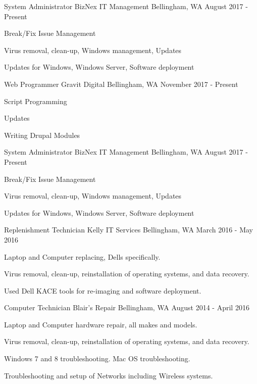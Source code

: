 \begin{cventries}
  \cventry
    {System Administrator}
    {BizNex IT Management}
    {Bellingham, WA}
    {August 2017 - Present}
    {
      \begin{cvitems}
      \item {Break/Fix Issue Management}
      \item {Virus removal, clean-up, Windows management, Updates}
      \item {Updates for Windows, Windows Server, Software deployment}
      \end{cvitems}
    }
  
  \cventry
    {Web Programmer}
    {Gravit Digital}
    {Bellingham, WA}
    {November 2017 - Present}
    {
      \begin{cvitems}
      \item {Script Programming}
      \item {Updates}
      \item {Writing Drupal Modules}
      \end{cvitems}
    }

  \cventry
    {System Administrator}
    {BizNex IT Management}
    {Bellingham, WA}
    {August 2017 - Present}
    {
      \begin{cvitems}
      \item {Break/Fix Issue Management}
      \item {Virus removal, clean-up, Windows management, Updates}
      \item {Updates for Windows, Windows Server, Software deployment}
      \end{cvitems}
    }

  \cventry
    {Replenishment Technician}
    {Kelly IT Services}
    {Bellingham, WA}
    {March 2016 - May 2016}
    {
      \begin{cvitems}
        \item {Laptop and Computer replacing, Dells specifically.}
        \item {Virus removal, clean-up, reinstallation of operating systems, and data recovery.}
        \item {Used Dell KACE tools for re-imaging and software deployment.}
      \end{cvitems}
    }

  \cventry
    {Computer Technician}
    {Blair’s Repair}
    {Bellingham, WA}
    {August 2014 - April 2016}
    {
      \begin{cvitems}
        \item {Laptop and Computer hardware repair, all makes and models.}
        \item {Virus removal, clean-up, reinstallation of operating systems, and data recovery.}
        \item {Windows 7 and 8 troubleshooting.  Mac OS troubleshooting.}
        \item {Troubleshooting and setup of Networks including Wireless systems.}
      \end{cvitems}
    }


\end{cventries}
